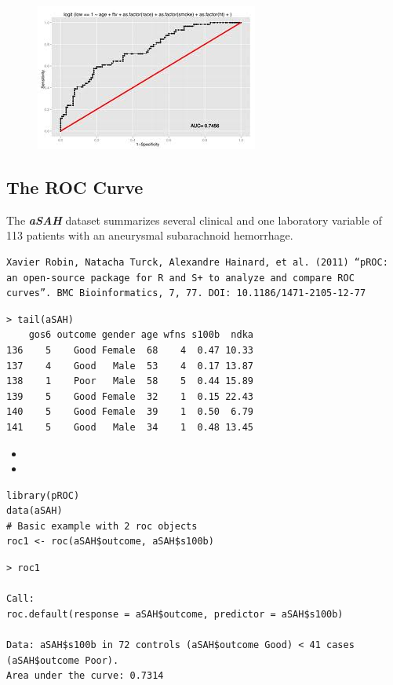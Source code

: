 \documentclass[caret-main.tex]{subfiles}
\begin{document}
\newpage
\begin{figure}
\centering
\includegraphics[width=0.4\linewidth]{./ROCcurve}
\caption{}
\label{fig:ROCcurve}
\end{figure}


\subsection{The ROC Curve}
The \textbf{\textit{aSAH}} dataset summarizes several clinical and one laboratory variable of 113 patients with an aneurysmal subarachnoid hemorrhage.

\begin{verbatim}
Xavier Robin, Natacha Turck, Alexandre Hainard, et al. (2011) “pROC: an open-source package for R and S+ to analyze and compare ROC curves”. BMC Bioinformatics, 7, 77. DOI: 10.1186/1471-2105-12-77
\end{verbatim}

\begin{verbatim}
> tail(aSAH)
    gos6 outcome gender age wfns s100b  ndka
136    5    Good Female  68    4  0.47 10.33
137    4    Good   Male  53    4  0.17 13.87
138    1    Poor   Male  58    5  0.44 15.89
139    5    Good Female  32    1  0.15 22.43
140    5    Good Female  39    1  0.50  6.79
141    5    Good   Male  34    1  0.48 13.45
\end{verbatim}
\begin{itemize}
\item
\item
\end{itemize}
\begin{framed}
\begin{verbatim}
library(pROC)
data(aSAH)
# Basic example with 2 roc objects
roc1 <- roc(aSAH$outcome, aSAH$s100b)
\end{verbatim}
\end{framed}

\begin{verbatim}
> roc1

Call:
roc.default(response = aSAH$outcome, predictor = aSAH$s100b)

Data: aSAH$s100b in 72 controls (aSAH$outcome Good) < 41 cases (aSAH$outcome Poor).
Area under the curve: 0.7314

\end{verbatim}


\end{document}
